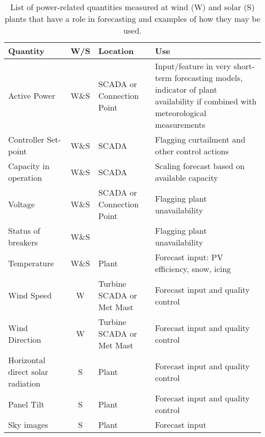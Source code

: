 \begin{table}[]
    \centering
    \caption{List of power-related quantities measured at wind (W) and solar (S) plants that have a role in forecasting and examples of how they may be used.}
    \begin{tabular}{|p{3cm}|c|p{4cm}|p{6.5cm}|} \hline
         Quantity & W/S & Location & Use \\ \hline
         Active Power & W\&S & SCADA or Connection Point & Input/feature in very short-term forecasting models, indicator of plant availability if combined with meteorological measurements \\
         Controller Set-point & W\&S & SCADA & Flagging curtailment and other control actions \\
         Capacity in operation & W\&S & SCADA & Scaling forecast based on available capacity \\
         Voltage & W\&S & SCADA or Connection Point & Flagging plant unavailability \\
         Status of breakers & W\&S & & Flagging plant unavailability \\
         Temperature & W\&S & Plant & Forecast input: PV efficiency, snow, icing \\
         Wind Speed & W & Turbine SCADA or Met Mast & Forecast input and quality control \\
         Wind Direction & W & Turbine SCADA or Met Mast & Forecast input and quality control \\
         Horizontal direct solar radiation & S & Plant & Forecast input and quality control \\
         Panel Tilt & S & Plant & Forecast input and quality control \\
         Sky images & S & Plant & Forecast input \\\hline
    \end{tabular}
    \label{tab:power_variables}
\end{table}




